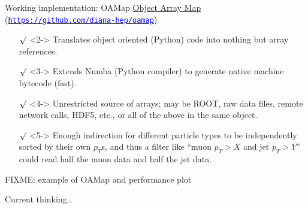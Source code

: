 \documentclass[aspectratio=169]{beamer}
\begin{document}
\begin{frame}{Working implementation: OAMap}
\vspace{0.5 cm}
\underline{Object Array Map} (\href{https://github.com/diana-hep/oamap}{\textcolor{blue}{\tt https://github.com/diana-hep/oamap}})

\vspace{0.25 cm}
\begin{itemize}\setlength{\itemsep}{0.25 cm}
\item[$\surd$]<2-> Translates object oriented (Python) code into nothing but array references.
\item[$\surd$]<3-> Extends Numba (Python compiler) to generate native machine bytecode (fast).
\item[$\surd$]<4-> Unrestricted source of arrays; may be ROOT, raw data files, remote network calls, HDF5, etc., or all of the above in the same object.
\item[$\surd$]<5-> Enough indirection for different particle types to be independently sorted by their own $p_T$s, and thus a filter like ``muon $p_T > X$ and jet $p_T > Y$'' could read half the muon data and half the jet data.
\end{itemize}
\end{frame}

\begin{frame}{}
FIXME: example of OAMap and performance plot
\end{frame}

\begin{frame}{Current thinking\ldots}
\vspace{0.5 cm}
\begin{center}
\end{center}
\end{frame}
\end{document}
